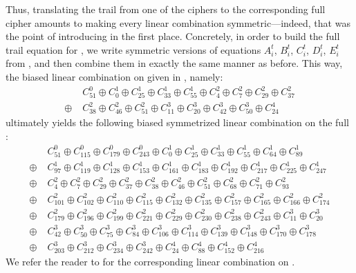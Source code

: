 Thus, translating the trail from one of the \MiniMORUS ciphers to the corresponding full \MORUS cipher amounts to making every linear combination symmetric---indeed, that was the point of introducing \MiniMORUS in the first place.
Concretely, in order to build the full trail equation for \MORUS, we write symmetric versions of equations $A^t_i$, $B^t_i$, $C^t_i$, $D^t_i$, $E^t_i$ from , and then combine them in exactly the same manner as before.
This way, the biased linear combination on \MiniMORUS[1280] given in , namely:
\begin{align*}
&C^0_{51} \oplus C^1_{0} \oplus C^1_{25} \oplus C^1_{33} \oplus C^1_{55} \oplus C^2_{4} \oplus C^2_{7} \oplus C^2_{29} \oplus C^2_{37}\\
\oplus\; &C^2_{38} \oplus C^2_{46} \oplus C^2_{51} \oplus C^3_{11} \oplus C^3_{20} \oplus C^3_{42} \oplus C^3_{50} \oplus C^4_{24}
\end{align*}
ultimately yields the following biased symmetrized linear combination on the full \MORUS[1280]:
\begin{align*}
&C^0_{51} \oplus C^0_{115} \oplus C^0_{179} \oplus C^0_{243} \oplus C^1_{0} \oplus C^1_{25} \oplus C^1_{33} \oplus C^1_{55} \oplus C^1_{64} \oplus C^1_{89}\\
\oplus\; & C^1_{97} \oplus C^1_{119} \oplus C^1_{128} \oplus C^1_{153} \oplus C^1_{161} \oplus C^1_{183} \oplus C^1_{192} \oplus C^1_{217} \oplus C^1_{225} \oplus C^1_{247}\\
\oplus\; & C^2_{4} \oplus C^2_{7} \oplus C^2_{29} \oplus C^2_{37} \oplus C^2_{38} \oplus C^2_{46} \oplus C^2_{51} \oplus C^2_{68} \oplus C^2_{71} \oplus C^2_{93}\\
\oplus\; & C^2_{101} \oplus C^2_{102} \oplus C^2_{110} \oplus C^2_{115} \oplus C^2_{132} \oplus C^2_{135} \oplus C^2_{157} \oplus C^2_{165} \oplus C^2_{166} \oplus C^2_{174}\\
\oplus\; & C^2_{179} \oplus C^2_{196} \oplus C^2_{199} \oplus C^2_{221} \oplus C^2_{229} \oplus C^2_{230} \oplus C^2_{238} \oplus C^2_{243} \oplus C^3_{11} \oplus C^3_{20}\\
\oplus\; & C^3_{42} \oplus C^3_{50} \oplus C^3_{75} \oplus C^3_{84} \oplus C^3_{106} \oplus C^3_{114} \oplus C^3_{139} \oplus C^3_{148} \oplus C^3_{170} \oplus C^3_{178}\\
\oplus\; & C^3_{203} \oplus C^3_{212} \oplus C^3_{234} \oplus C^3_{242} \oplus C^4_{24} \oplus C^4_{88} \oplus C^4_{152} \oplus C^4_{216}
\end{align*}
We refer the reader to  for the corresponding linear combination on \MORUS[640].

